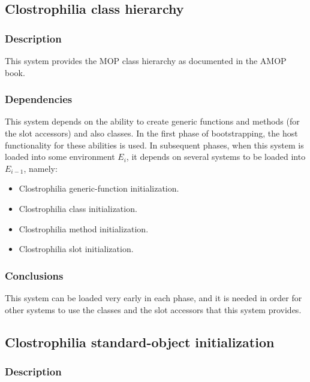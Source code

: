 \subsection{Clostrophilia class hierarchy}
\label{clostrophilia-class-hierarchy}

\subsubsection{Description}

This system provides the MOP class hierarchy as documented in the AMOP
book.

\subsubsection{Dependencies}

This system depends on the ability to create generic functions and
methods (for the slot accessors) and also classes.  In the first phase
of bootstrapping, the host functionality for these abilities is used.
In subsequent phases, when this system is loaded into some environment
$E_i$, it depends on several systems to be loaded into $E_{i-1}$,
namely:

\begin{itemize}
\item Clostrophilia generic-function initialization.
\item Clostrophilia class initialization.
\item Clostrophilia method initialization.
\item Clostrophilia slot initialization.
\end{itemize}

\subsubsection{Conclusions}

This system can be loaded very early in each phase, and it is needed
in order for other systems to use the classes and the slot accessors
that this system provides.

\subsection{Clostrophilia standard-object initialization}

\subsubsection{Description}

